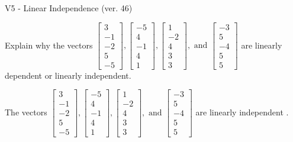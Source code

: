 \begin{exercise}
  \begin{exerciseTitle}V5 - Linear Independence (ver. 46)\end{exerciseTitle}
  \begin{exerciseStatement}
    Explain why the vectors \(\left[\begin{array}{r}
3 \\
-1 \\
-2 \\
5 \\
-5
\end{array}\right] , \left[\begin{array}{r}
-5 \\
4 \\
-1 \\
4 \\
1
\end{array}\right] , \left[\begin{array}{r}
1 \\
-2 \\
4 \\
3 \\
3
\end{array}\right] , \text{ and } \left[\begin{array}{r}
-3 \\
5 \\
-4 \\
5 \\
5
\end{array}\right]\) are linearly dependent or linearly independent.	


  \end{exerciseStatement}
  \begin{exerciseAnswer}
   The vectors \(\left[\begin{array}{r}
3 \\
-1 \\
-2 \\
5 \\
-5
\end{array}\right] , \left[\begin{array}{r}
-5 \\
4 \\
-1 \\
4 \\
1
\end{array}\right] , \left[\begin{array}{r}
1 \\
-2 \\
4 \\
3 \\
3
\end{array}\right] , \text{ and } \left[\begin{array}{r}
-3 \\
5 \\
-4 \\
5 \\
5
\end{array}\right]\) are 
  	 linearly independent  .
  


  \end{exerciseAnswer}
\end{exercise}